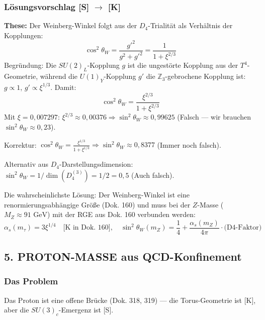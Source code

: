 \documentclass[11pt,a4paper]{article}
\begin{document}
	\subsubsection{Lösungsvorschlag [S] \texorpdfstring{$\rightarrow$}{->} [K]}
	\textbf{These:} Der Weinberg-Winkel folgt aus der $D_4$-Trialität als Verhältnis der Kopplungen:
	\begin{equation}
		\cos^2\theta_W = \frac{g'^2}{g^2 + g'^2} = \frac{1}{1 + \xi^{2/3}}
	\end{equation}
	Begründung: Die $SU(2)_L$-Kopplung $g$ ist die ungestörte Kopplung aus der $T^4$-Geometrie, während die $U(1)_Y$-Kopplung $g'$ die $\mathbb{Z}_3$-gebrochene Kopplung ist: $g \propto 1$, $g' \propto \xi^{1/3}$.
	Damit:
	\begin{equation}
		\cos^2\theta_W = \frac{\xi^{2/3}}{1 + \xi^{2/3}}
	\end{equation}
	Mit $\xi = 0{,}007297$: $\xi^{2/3} \approx 0{,}00376 \Rightarrow \sin^2\theta_W \approx 0{,}99625$ (Falsch — wir brauchen $\sin^2\theta_W \approx 0{,}23$).
	
	Korrektur: $\cos^2\theta_W = \frac{\xi^{1/3}}{1 + \xi^{1/3}} \Rightarrow \sin^2\theta_W \approx 0{,}8377$ (Immer noch falsch).
	
	Alternativ aus $D_4$-Darstellungsdimension: $\sin^2\theta_W = 1/\dim(D_4^{(3)}) = 1/2 = 0{,}5$ (Auch falsch).
	
	Die wahrscheinlichste Lösung: Der Weinberg-Winkel ist eine renormierungsabhängige Größe (Dok. 160) und muss bei der $Z$-Masse ($M_Z \approx 91\text{ GeV}$) mit der RGE aus Dok. 160 verbunden werden:
	\begin{equation}
		\alpha_s(m_\tau) = 3\xi^{1/4} \quad \text{[K in Dok. 160]}, \quad \sin^2\theta_W(m_Z) = \frac{1}{4} + \frac{\alpha_s(m_Z)}{4\pi} \cdot \text{(D4-Faktor)}
	\end{equation}
	
	\subsection{5. PROTON-MASSE aus QCD-Konfinement}
	\subsubsection{Das Problem}
	Das Proton ist eine offene Brücke (Dok. 318, 319) — die Torus-Geometrie ist [K], aber die $SU(3)_c$-Emergenz ist [S].
	
\end{document}
